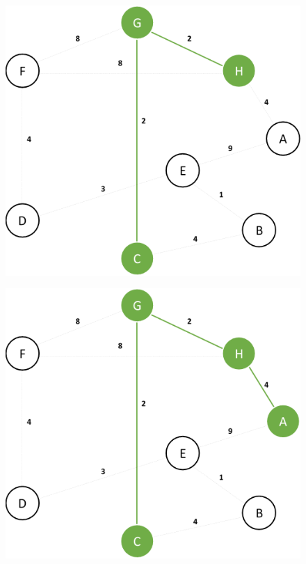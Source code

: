 \documentclass{article}
\begin{document}
\begin{figure}[H]
\centering
\includegraphics[scale=0.6]{images/Q2/03.png}
\end{figure}

\begin{figure}[H]
\centering
\includegraphics[scale=0.6]{images/Q2/04.png}
\end{figure}
\end{document}
